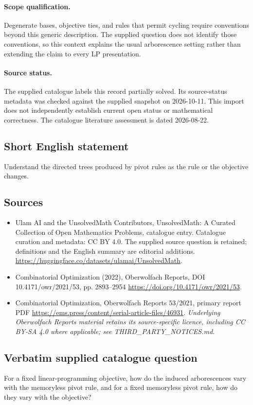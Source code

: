 \documentclass[11pt]{article}
\begin{document}
\paragraph{Scope qualification.}
Degenerate bases, objective ties, and rules that permit cycling require conventions beyond this generic description. The supplied question does not identify those conventions, so this context explains the usual arborescence setting rather than extending the claim to every LP presentation.
\paragraph{Source status.}
The supplied catalogue labels this record partially solved. Its source-status metadata was checked against the supplied snapshot on 2026-10-11. This import does not independently establish current open status or mathematical correctness. The catalogue literature assessment is dated 2026-08-22.
\subsection{Short English statement}
Understand the directed trees produced by pivot rules as the rule or the objective changes.
\subsection{Sources}
\begin{itemize}
\item[S1] Ulam AI and the UnsolvedMath Contributors, UnsolvedMath: A Curated Collection of Open Mathematics Problems, catalogue entry. Catalogue curation and metadata: CC BY 4.0. The supplied source question is retained; definitions and the English summary are editorial additions.
\url{https://huggingface.co/datasets/ulamai/UnsolvedMath}.
\item[S2] Combinatorial Optimization (2022), Oberwolfach Reports, DOI 10.4171/owr/2021/53, pp. 2893--2954
\url{https://doi.org/10.4171/owr/2021/53}.
\item[S3] Combinatorial Optimization, Oberwolfach Reports 53/2021, primary report PDF
\url{https://ems.press/content/serial-article-files/46931}.
\textit{Underlying Oberwolfach Reports material retains its source-specific licence, including CC BY-SA 4.0 where applicable; see THIRD\_PARTY\_NOTICES.md.}
\end{itemize}
\subsection{Verbatim supplied catalogue question}
For a fixed linear-programming objective, how do the induced arborescences vary with the memoryless pivot rule, and for a fixed memoryless pivot rule, how do they vary with the objective?
\end{document}
